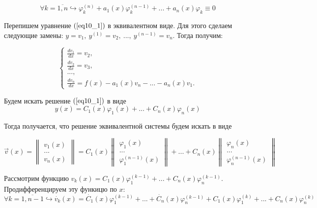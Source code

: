 \begin{equation}\label{eq10_2}
\forall k = \overline{1, n} \hookrightarrow \varphi_k^{(n)} + a_1(x)\varphi_k^{(n-1)} + ... + a_n(x)\varphi_k \equiv 0
\end{equation}

Перепишем уравнение $(\ref{eq10_1})$ в эквивалентном виде. Для этого сделаем следующие замены: $y = v_1, ~y^{(1)} = v_2,~..., ~y^{(n-1)} = v_n$. Тогда получим:

\begin{equation}\label{eq10_3}
 \begin{cases}
   \frac{dv_1}{dx} = v_2, 
   \\
   \frac{dv_2}{dx} = v_3,
   \\
   ...,
   \\
   \frac{dv_n}{dx} = f(x) - a_1(x)v_n - ... - a_n(x)v_1.
 \end{cases}
\end{equation}

Будем искать решение $(\ref{eq10_1})$ в виде
\[y(x) = C_1(x)\varphi_1(x) + ... + C_n(x)\varphi_n(x)\]

Тогда получается, что решение эквивалентной системы будем искать в виде

\begin{equation}
\overrightarrow{v}(x) = 
  \begin{Vmatrix}
      v_1(x)\\
      ...\\
      v_n(x)
  \end{Vmatrix} = C_1(x)
    \begin{Vmatrix}
        \varphi_1(x)\\
        ...\\
        \varphi_1^{(n-1)}(x)
    \end{Vmatrix} + ... + C_n(x)
      \begin{Vmatrix}
          \varphi_n(x)\\
          ...\\
          \varphi_n^{(n-1)}(x)
      \end{Vmatrix}
\end{equation}

Рассмотрим функцию $v_k(x) = C_1(x)\varphi_1^{(k-1)} + ... + C_n(x)\varphi_n^{(k-1)}$. Продифференцируем эту функицю по $x$:
\begin{equation}
\forall k =\overline{1, n-1} \hookrightarrow \dot{v_k}(x) = \dot{C_1}(x)\varphi_1^{(k-1)} + ... + \dot{C_n}(x)\varphi_n^{(k-1)} + C_1(x)\varphi_1^{(k)} + ... + C_n(x)\varphi_n^{(k)}
\end{equation}

